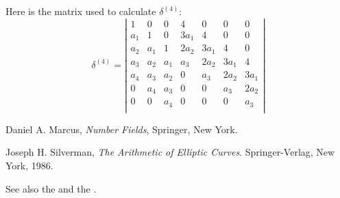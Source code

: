 \documentclass[12pt]{article}
\begin{document}
Here is the matrix used to calculate $\delta^{(4)}$:
\[
\delta^{(4)} = 
\left | 
  \begin{array}{ccccccc}
    1   & 0   & 0   & 4    & 0    & 0  & 0 \\
    a_1 & 1   & 0   & 3a_1 & 4    & 0  & 0 \\
    a_2 & a_1 & 1   & 2a_2 & 3a_1 & 4  & 0 \\
    a_3 & a_2 & a_1 &  a_3 & 2a_2 &3a_1& 4 \\
    a_4 & a_3 & a_2 &   0  &  a_3 &2a_2&3a_1\\
      0 & a_4 & a_3 &    0 &    0 & a_3&2a_2\\
      0 &   0 & a_4 &    0 &    0 &   0& a_3\\
    \end{array}\right|
\]

\begin{thebibliography}{99}


 Daniel A. Marcus, {\em Number Fields}, Springer, New York.

 Joseph H. Silverman, {\em The Arithmetic of Elliptic Curves}. Springer-Verlag, New York, 1986.

\end{thebibliography}

See also the  and the .
\end{document}
